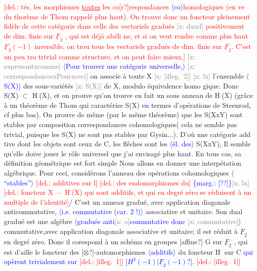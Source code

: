 \documentclass[11pt]{article}
\newcommand{\scanpage}[1]{\par\bigskip\noindent{\small\sffamily[scan #1]}\par}
\newcommand{\mspage}[1]{{\small\sffamily[p.\,#1]}}
\newcommand{\hand}[1]{\textcolor{blue}{#1}}
\newcommand{\inserted}[2][]{\textcolor{blue}{$\langle$#2$\rangle$}}
\newcommand{\margin}[1]{\textcolor{blue}{\{\textsf{marg.:} #1\}}}
\newcommand{\deleted}[1]{\textcolor{red}{[\textsf{del.:} #1]}}
\newcommand{\xout}[1]{\textcolor{gray}{[\textsf{x:} #1]}}
\newcommand{\uline}[1]{\underline{#1}}
\newcommand{\unsure}[1]{[#1?]}
\newcommand{\illegible}[1]{[\textsf{illeg.\ #1}]}
\begin{document}
\mspage{15}

\clearpage
\scanpage{162-5/16}
\mspage{15}

\deleted{tés, les morphismes \uline{toutes} les co\unsure{r}respondances \inserted[typed]{co}homologiques (en ve
du thorème de Thom rappelé plus haut). On trouve donc un foncteur
pleinement fidèle de cette catégorie dans celle des vectoriels
gradués \xout{dxxd} positivement de dim. finie sur $\underline{F}_2$ , qui est déjà abéli
ne, et si on veut rendre comme plus haut $\underline{F}_2(-1)$ inversible, on trou
tous les vectoriels gradués de dim. finie sur $\underline{F}_2$. C'est un peu tro
trivial comme structure, et on peut faire mieux,} \xout{exprenantxcomme}
\inserted[typed]{Pour trouver une catégorie universelle,}
\xout{correspondancesxPourxceci} on associe à toute X \xout{\illegible{2}}
\xout{lx} l'ensemble \inserted[typed]{S(X)} des sous-variétés \xout{S(X)} de X, modulo équivalence homo
gique. Donc S(X) $\subset$ H$^{\cdot}$(X), et on prouve qu'on trouve en fait un sous
anneau de H$^{\cdot}$(X) (grâce à un théorème de Thom qui caractérise S(X) \hand{en}
termes d'opérations de Steenrod, cf plus bas). On prouve de même
(par le même théorème) que les S(XxY) sont stables par composition
correspondances cohomologiques( cela ne semble pas trivial, puisque
les S(X) ne sont pas stables par Gysin...). D'où une catégorie add
tive dont les objets sont ceux de C, les flêches sont les \inserted{él. des} S(XxY),
Il semble qu'elle doive jouer le rôle universel que j'ai envisagé
plus haut. En tous cas, sa définition géométrique est fort simple
Nous allons en donner une interpétation algébrique. Pour ceci,
considérons l'anneau des opérations cohomologiques \inserted[typed]{``stables''} \deleted{additives sur l}
\deleted{des endomorphismes du}
\margin{\unsure{?}}\xout{lx} \deleted{foncteur X --- H$^{\cdot}$(X) qui sont additifs, et qui en degré zéro se
réduisent à un multiple de l'identité}\hand{/} C'est un anneau gradué, avec
application diagonale anticommutative, \inserted[typed]{i.e. commutative (car. 2 !)} associative et unitaire. Son
dual gradué est une algèbre \inserted[typed]{graduée anti\xout{o}commutative donc \xout{commutative}} commutative,avec application diagonale
associative et unitaire; il est réduit à $\underline{F}_2$ en degré zéro. Donc il
corespond à un schéma en groupes \unsure{affine} G sur $\underline{F}_2$ , qui est d'aille
le foncteur des \unsure{$\otimes$}-automorphismes \inserted[typed]{additifs} du foncteur H$^{\cdot}$ sur C \hand{qui opèrent
trivialement sur \deleted{\illegible{1}} \unsure{$H^2(-1)$|$\underline{F}_2(-1)$}. \deleted{\illegible{1}}}
\end{document}
